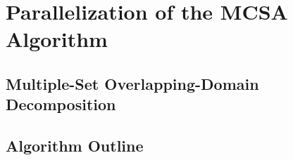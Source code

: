 \chapter{Parallelization of the MCSA Algorithm}
\label{ch:parallel_mcsa}

\section{Multiple-Set Overlapping-Domain Decomposition}
\label{sec:msod}

\section{Algorithm Outline}
\label{sec:algorithm_outline}
